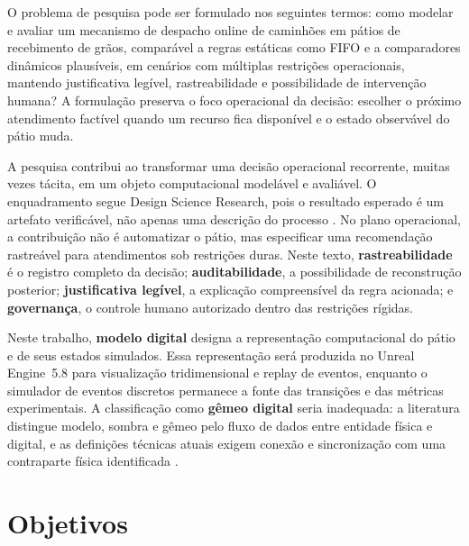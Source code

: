 \documentclass[
  12pt,
  oneside,
  a4paper,
  sumario=tradicional,
  brazil
]{abntex2}
\begin{document}
O problema de pesquisa pode ser formulado nos seguintes termos: como modelar e avaliar um mecanismo de despacho online de caminh\~oes em p\'atios de recebimento de gr\~aos, compar\'avel a regras est\'aticas como FIFO e a comparadores din\^amicos plaus\'iveis, em cen\'arios com m\'ultiplas restri\c{c}\~oes operacionais, mantendo justificativa leg\'ivel, rastreabilidade e possibilidade de interven\c{c}\~ao humana? A formula\c{c}\~ao preserva o foco operacional da decis\~ao: escolher o pr\'oximo atendimento fact\'ivel quando um recurso fica dispon\'ivel e o estado observ\'avel do p\'atio muda.

A pesquisa contribui ao transformar uma decis\~ao operacional recorrente, muitas vezes t\'acita, em um objeto computacional model\'avel e avali\'avel. O enquadramento segue Design Science Research, pois o resultado esperado \'e um artefato verific\'avel, n\~ao apenas uma descri\c{c}\~ao do processo \parencite{hevnerDesignScienceInformation2004a, peffersDesignScienceResearch2007aa}. No plano operacional, a contribui\c{c}\~ao n\~ao \'e automatizar o p\'atio, mas especificar uma recomenda\c{c}\~ao rastre\'avel para atendimentos sob restri\c{c}\~oes duras. Neste texto, \textbf{rastreabilidade} \'e o registro completo da decis\~ao; \textbf{auditabilidade}, a possibilidade de reconstru\c{c}\~ao posterior; \textbf{justificativa leg\'ivel}, a explica\c{c}\~ao compreens\'ivel da regra acionada; e \textbf{governan\c{c}a}, o controle humano autorizado dentro das restri\c{c}\~oes r\'igidas.

Neste trabalho, \textbf{modelo digital} designa a representa\c{c}\~ao computacional do p\'atio
e de seus estados simulados. Essa representa\c{c}\~ao ser\'a produzida no Unreal Engine~5.8
para visualiza\c{c}\~ao tridimensional e replay de eventos, enquanto o simulador de eventos
discretos permanece a fonte das transi\c{c}\~oes e das m\'etricas experimentais. A
classifica\c{c}\~ao como \textbf{g\^emeo digital} seria inadequada: a literatura distingue
modelo, sombra e g\^emeo pelo fluxo de dados entre entidade f\'isica e digital, e as
defini\c{c}\~oes t\'ecnicas atuais exigem conex\~ao e sincroniza\c{c}\~ao com uma contraparte
f\'isica identificada \parencite{kritzingerDigitalTwinManufacturing2018,nistDigitalTwinsEssentialElements2026,isoSmartManufacturingWhitePaper2021}.

\section{Objetivos}
\end{document}
